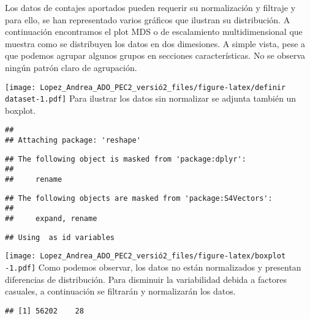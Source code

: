 \documentclass[
]{article}
\newenvironment{Shaded}{\begin{snugshade}}{\end{snugshade}}
\newcommand{\DataTypeTok}[1]{\textcolor[rgb]{0.13,0.29,0.53}{#1}}
\newcommand{\DecValTok}[1]{\textcolor[rgb]{0.00,0.00,0.81}{#1}}
\newcommand{\KeywordTok}[1]{\textcolor[rgb]{0.13,0.29,0.53}{\textbf{#1}}}
\newcommand{\NormalTok}[1]{#1}
\newcommand{\OperatorTok}[1]{\textcolor[rgb]{0.81,0.36,0.00}{\textbf{#1}}}
\newcommand{\StringTok}[1]{\textcolor[rgb]{0.31,0.60,0.02}{#1}}
\begin{document}
Los datos de contajes aportados pueden requerir su normalización y
filtraje y para ello, se han representado varios gráficos que ilustran
su distribución. A continuación encontramos el plot MDS o de
escalamiento multidimensional que muestra como se distribuyen los datos
en dos dimesiones. A simple vista, pese a que podemos agrupar algunos
grupos en secciones características. No se observa ningún patrón claro
de agrupación.

\begin{Shaded}
\end{Shaded}

\texttt{[image: Lopez\_Andrea\_ADO\_PEC2\_versió2\_files/figure-latex/definir dataset-1.pdf]}
Para ilustrar los datos sin normalizar se adjunta también un boxplot.

\begin{verbatim}
## 
## Attaching package: 'reshape'
\end{verbatim}

\begin{verbatim}
## The following object is masked from 'package:dplyr':
## 
##     rename
\end{verbatim}

\begin{verbatim}
## The following objects are masked from 'package:S4Vectors':
## 
##     expand, rename
\end{verbatim}

\begin{verbatim}
## Using  as id variables
\end{verbatim}

\texttt{[image: Lopez\_Andrea\_ADO\_PEC2\_versió2\_files/figure-latex/boxplot -1.pdf]}
Como podemos observar, los datos no están normalizados y presentan
diferencias de distribución. Para disminuir la variabilidad debida a
factores casuales, a continuación se filtrarán y normalizarán los datos.

\begin{verbatim}
## [1] 56202    28
\end{verbatim}
\end{document}
